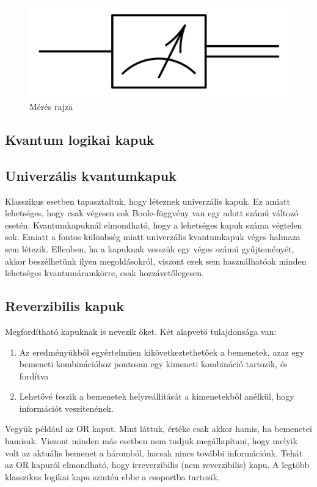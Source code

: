 \documentclass[
]{thesis-ekf}
\theoremstyle{definition}
\theoremstyle{remark}
\begin{document}
\begin{figure}[H]
	\centering
	\includegraphics[width=0.3\linewidth]{measure}
	\caption{Mérés rajza}
	\label{fig:measure}
\end{figure}

\subsection{Kvantum logikai kapuk}

\subsection{Univerzális kvantumkapuk}
Klasszikus esetben tapasztaltuk, hogy léteznek univerzális kapuk. Ez amiatt lehetséges, hogy csak végesen sok Boole-függvény van egy adott számú változó esetén. Kvantumkapuknál elmondható, hogy a lehetséges kapuk száma végtelen sok. Emiatt a fontos különbség miatt univerzális kvantumkapuk véges halmaza sem létezik. Ellenben, ha a kapuknak vesszük egy véges számú gyűjteményét, akkor beszélhetünk ilyen megoldásokról, viszont ezek sem használhatóak minden lehetséges kvantumáramkörre, csak hozzávetőlegesen.

\subsection{Reverzibilis kapuk}
Megfordítható kapuknak is nevezik őket. Két alapvető tulajdonsága van:
\begin{enumerate}
	\item Az eredményükből egyértelműen kikövetkeztethetőek a bemenetek, azaz egy bemeneti kombinációhoz pontosan egy kimeneti kombináció tartozik, és fordítva
	\item Lehetővé teszik a bemenetek helyreállítását a kimenetekből anélkül, hogy információt veszítenének.
\end{enumerate}

Vegyük például az OR kaput. Mint láttuk, értéke csak akkor hamis, ha bemenetei hamisak. Viszont minden más esetben nem tudjuk megállapítani, hogy melyik volt az aktuális bemenet a háromból, hacsak nincs további információnk. Tehát az OR kapuról elmondható, hogy irreverzibilis (nem reverzibilis) kapu. A legtöbb klasszikus logikai kapu szintén ebbe a csoportba tartozik.
\end{document}
